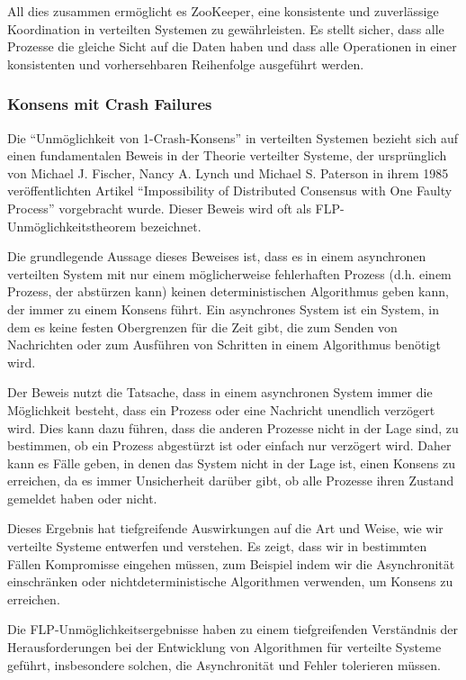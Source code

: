 All dies zusammen ermöglicht es ZooKeeper, eine konsistente und zuverlässige Koordination in verteilten Systemen zu gewährleisten. Es stellt sicher, dass alle Prozesse die gleiche Sicht auf die Daten haben und dass alle Operationen in einer konsistenten und vorhersehbaren Reihenfolge ausgeführt werden. 

\subsubsection{Konsens mit Crash Failures}
Die \enquote{Unmöglichkeit von 1-Crash-Konsens} in verteilten Systemen bezieht sich auf einen fundamentalen Beweis in der Theorie verteilter Systeme, der ursprünglich von Michael J. Fischer, Nancy A. Lynch und Michael S. Paterson in ihrem 1985 veröffentlichten Artikel \enquote{Impossibility of Distributed Consensus with One Faulty Process} vorgebracht wurde. Dieser Beweis wird oft als FLP-Unmöglichkeitstheorem bezeichnet.

Die grundlegende Aussage dieses Beweises ist, dass es in einem asynchronen verteilten System mit nur einem möglicherweise fehlerhaften Prozess (d.h. einem Prozess, der abstürzen kann) keinen deterministischen Algorithmus geben kann, der immer zu einem Konsens führt. Ein asynchrones System ist ein System, in dem es keine festen Obergrenzen für die Zeit gibt, die zum Senden von Nachrichten oder zum Ausführen von Schritten in einem Algorithmus benötigt wird.

Der Beweis nutzt die Tatsache, dass in einem asynchronen System immer die Möglichkeit besteht, dass ein Prozess oder eine Nachricht unendlich verzögert wird. Dies kann dazu führen, dass die anderen Prozesse nicht in der Lage sind, zu bestimmen, ob ein Prozess abgestürzt ist oder einfach nur verzögert wird. Daher kann es Fälle geben, in denen das System nicht in der Lage ist, einen Konsens zu erreichen, da es immer Unsicherheit darüber gibt, ob alle Prozesse ihren Zustand gemeldet haben oder nicht.

Dieses Ergebnis hat tiefgreifende Auswirkungen auf die Art und Weise, wie wir verteilte Systeme entwerfen und verstehen. Es zeigt, dass wir in bestimmten Fällen Kompromisse eingehen müssen, zum Beispiel indem wir die Asynchronität einschränken oder nichtdeterministische Algorithmen verwenden, um Konsens zu erreichen.

Die FLP-Unmöglichkeitsergebnisse haben zu einem tiefgreifenden Verständnis der Herausforderungen bei der Entwicklung von Algorithmen für verteilte Systeme geführt, insbesondere solchen, die Asynchronität und Fehler tolerieren müssen.


